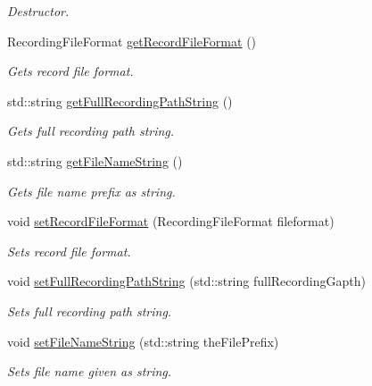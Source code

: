 \begin{DoxyCompactItemize}
\begin{DoxyCompactList}\small\item\em Destructor. \end{DoxyCompactList}\item 
Recording\+File\+Format \hyperlink{class_simple_recording_configuration_af68ce5a5bea0bf9da25e95266c684f56}{get\+Record\+File\+Format} ()
\begin{DoxyCompactList}\small\item\em Gets record file format. \end{DoxyCompactList}\item 
std\+::string \hyperlink{class_simple_recording_configuration_a9b46181e3fcf6b8b27f33ae878f45b0e}{get\+Full\+Recording\+Path\+String} ()
\begin{DoxyCompactList}\small\item\em Gets full recording path string. \end{DoxyCompactList}\item 
std\+::string \hyperlink{class_simple_recording_configuration_ae28ce09b38e1029cf1eab94ff1a51b9a}{get\+File\+Name\+String} ()
\begin{DoxyCompactList}\small\item\em Gets file name prefix as string. \end{DoxyCompactList}\item 
void \hyperlink{class_simple_recording_configuration_affd217f70efb4b5aa41657ec57bdd6b8}{set\+Record\+File\+Format} (Recording\+File\+Format fileformat)
\begin{DoxyCompactList}\small\item\em Sets record file format. \end{DoxyCompactList}\item 
void \hyperlink{class_simple_recording_configuration_ad79cfd752bd8095be050ff4d39fcc900}{set\+Full\+Recording\+Path\+String} (std\+::string full\+Recording\+Gapth)
\begin{DoxyCompactList}\small\item\em Sets full recording path string. \end{DoxyCompactList}\item 
void \hyperlink{class_simple_recording_configuration_aa22a7a67d3424ede25e3cb56ef0299c5}{set\+File\+Name\+String} (std\+::string the\+File\+Prefix)
\begin{DoxyCompactList}\small\item\em Sets file name given as string. \end{DoxyCompactList}\item 

\end{DoxyCompactItemize}
